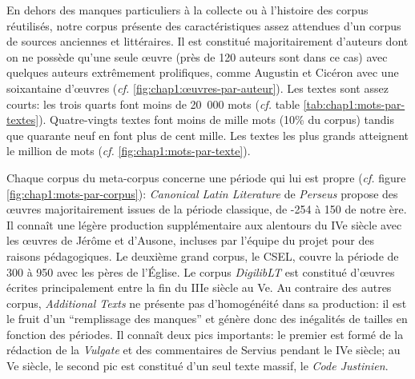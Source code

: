 En dehors des manques particuliers à la collecte ou à l'histoire des corpus réutilisés, notre corpus présente des caractéristiques assez attendues d'un corpus de sources anciennes et littéraires. Il est constitué majoritairement d'auteurs dont on ne possède qu'une seule œuvre (près de 120 auteurs sont dans ce cas) avec quelques auteurs extrêmement prolifiques, comme Augustin et Cicéron avec une soixantaine d'œuvres (\textit{cf.} \ref{fig:chap1:œuvres-par-auteur}). Les textes sont assez courts: les trois quarts font moins de 20~000 mots (\textit{cf.} table \ref{tab:chap1:mots-par-textes}). Quatre-vingts textes font moins de mille mots (10\% du corpus) tandis que quarante neuf en font plus de cent mille. Les textes les plus grands atteignent le million de mots (\textit{cf.} \ref{fig:chap1:mots-par-texte}).

Chaque corpus du meta-corpus concerne une période qui lui est propre (\textit{cf.} figure \ref{fig:chap1:mots-par-corpus}): \textit{Canonical Latin Literature} de \textit{Perseus} propose des œuvres majoritairement issues de la période classique, de -254 à 150 de notre ère. Il connaît une légère production supplémentaire aux alentours du IVe siècle avec les œuvres de Jérôme et d'Ausone, incluses par l'équipe du projet pour des raisons pédagogiques. Le deuxième grand corpus, le CSEL, couvre la période de 300 à 950 avec les pères de l'Église. Le corpus \textit{DigilibLT} est constitué d'œuvres écrites principalement entre la fin du IIIe siècle au Ve. Au contraire des autres corpus, \textit{Additional Texts} ne présente pas d'homogénéité dans sa production: il est le fruit d'un \enquote{remplissage des manques} et génère donc des inégalités de tailles en fonction des périodes. Il connaît deux pics importants: le premier est formé de la rédaction de la \textit{Vulgate} et des commentaires de Servius pendant le IVe siècle; au Ve siècle, le second pic est constitué d'un seul texte massif, le \textit{Code Justinien}.

